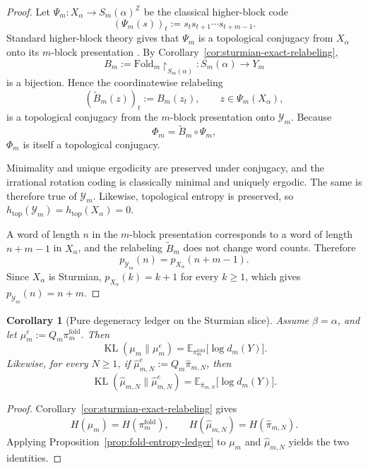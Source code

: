 \documentclass[11pt,letterpaper]{article}
\numberwithin{equation}{section}
\theoremstyle{plain}
\newtheorem{corollary}[theorem]{Corollary}
\theoremstyle{definition}
\theoremstyle{remark}
\newcommand{\Fold}{\mathrm{Fold}}
\DeclareMathOperator{\KL}{KL}
\begin{document}
\begin{proof}
Let \(\Psi_m:X_\alpha\to S_m(\alpha)^{\mathbb{Z}}\) be the classical higher-block
code
\[
(\Psi_m(s))_t:=s_t s_{t+1}\cdots s_{t+m-1}.
\]
Standard higher-block theory gives that \(\Psi_m\) is a topological conjugacy
from \(X_\alpha\) onto its \(m\)-block presentation
\cite{LindMarcus1995}. By Corollary~\ref{cor:sturmian-exact-relabeling},
\[
B_m:=\Fold_m\!\upharpoonright_{S_m(\alpha)}:S_m(\alpha)\to Y_m
\]
is a bijection. Hence the coordinatewise relabeling
\[
(\widetilde B_m(z))_t:=B_m(z_t),
\qquad z\in \Psi_m(X_\alpha),
\]
is a topological conjugacy from the \(m\)-block presentation onto
\(\mathcal{Y}_m\).
Because
\[
\Phi_m=\widetilde B_m\circ \Psi_m,
\]
\(\Phi_m\) is itself a topological conjugacy.

Minimality and unique ergodicity are preserved under conjugacy, and the
irrational rotation coding is classically minimal and uniquely ergodic. The
same is therefore true of \(\mathcal{Y}_m\). Likewise, topological entropy is
preserved, so \(h_{\mathrm{top}}(\mathcal{Y}_m)=h_{\mathrm{top}}(X_\alpha)=0\).

A word of length \(n\) in the \(m\)-block presentation corresponds to a word of
length \(n+m-1\) in \(X_\alpha\), and the relabeling \(\widetilde B_m\) does
not change word counts. Therefore
\[
p_{\mathcal{Y}_m}(n)=p_{X_\alpha}(n+m-1).
\]
Since \(X_\alpha\) is Sturmian, \(p_{X_\alpha}(k)=k+1\) for every \(k\ge 1\),
which gives \(p_{\mathcal{Y}_m}(n)=n+m\).
\end{proof}

\begin{corollary}[Pure degeneracy ledger on the Sturmian slice]\label{cor:sturmian-pure-degeneracy-ledger}
Assume \(\beta=\alpha\), and let \(\mu_m^e:=Q_m\pi_m^{\mathrm{fold}}\). Then
\[
\KL(\mu_m\|\mu_m^e)
=
\mathbb{E}_{\pi_m^{\mathrm{fold}}}\bigl[\log d_m(Y)\bigr].
\]
Likewise, for every \(N\ge 1\), if \(\hat\mu_{m,N}^e:=Q_m\hat\pi_{m,N}\), then
\[
\KL(\hat\mu_{m,N}\|\hat\mu_{m,N}^e)
=
\mathbb{E}_{\hat\pi_{m,N}}\bigl[\log d_m(Y)\bigr].
\]
\end{corollary}

\begin{proof}
Corollary~\ref{cor:sturmian-exact-relabeling} gives
\[
H(\mu_m)=H(\pi_m^{\mathrm{fold}}),
\qquad
H(\hat\mu_{m,N})=H(\hat\pi_{m,N}).
\]
Applying Proposition~\ref{prop:fold-entropy-ledger} to \(\mu_m\) and
\(\hat\mu_{m,N}\) yields the two identities.
\end{proof}
\end{document}
